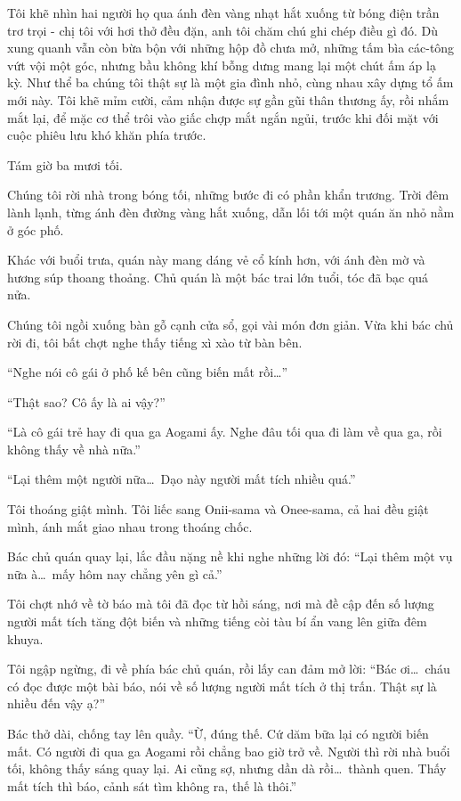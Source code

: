 \documentclass[../main.tex]{subfiles}
\begin{document}
Tôi khẽ nhìn hai người họ qua ánh đèn vàng nhạt hắt xuống từ bóng điện trần trơ trọi - chị tôi với hơi thở đều đặn, anh tôi chăm chú ghi chép điều gì đó. Dù xung quanh vẫn còn bừa bộn với những hộp đồ chưa mở, những tấm bìa các-tông vứt vội một góc, nhưng bầu không khí bỗng dưng mang lại một chút ấm áp lạ kỳ. Như thể ba chúng tôi thật sự là một gia đình nhỏ, cùng nhau xây dựng tổ ấm mới này. Tôi khẽ mỉm cười, cảm nhận được sự gần gũi thân thương ấy, rồi nhắm mắt lại, để mặc cơ thể trôi vào giấc chợp mắt ngắn ngủi, trước khi đối mặt với cuộc phiêu lưu khó khăn phía trước.

\ct

Tám giờ ba mươi tối.

Chúng tôi rời nhà trong bóng tối, những bước đi có phần khẩn trương. Trời đêm lành lạnh, từng ánh đèn đường vàng hắt xuống, dẫn lối tới một quán ăn nhỏ nằm ở góc phố.

Khác với buổi trưa, quán này mang dáng vẻ cổ kính hơn, với ánh đèn mờ và hương súp thoang thoảng. Chủ quán là một bác trai lớn tuổi, tóc đã bạc quá nửa.

Chúng tôi ngồi xuống bàn gỗ cạnh cửa sổ, gọi vài món đơn giản. Vừa khi bác chủ rời đi, tôi bất chợt nghe thấy tiếng xì xào từ bàn bên.

``Nghe nói cô gái ở phố kế bên cũng biến mất rồi\dots''

``Thật sao? Cô ấy là ai vậy?''

``Là cô gái trẻ hay đi qua ga Aogami ấy. Nghe đâu tối qua đi làm về qua ga, rồi không thấy về nhà nữa.''

``Lại thêm một người nữa\dots\ Dạo này người mất tích nhiều quá.''

Tôi thoáng giật mình. Tôi liếc sang Onii-sama và Onee-sama, cả hai đều giật mình, ánh mắt giao nhau trong thoáng chốc.

Bác chủ quán quay lại, lắc đầu nặng nề khi nghe những lời đó: ``Lại thêm một vụ nữa à\dots\ mấy hôm nay chẳng yên gì cả.''

Tôi chợt nhớ về tờ báo mà tôi đã đọc từ hồi sáng, nơi mà đề cập đến số lượng người mất tích tăng đột biến và những tiếng còi tàu bí ẩn vang lên giữa đêm khuya.

Tôi ngập ngừng, đi về phía bác chủ quán, rồi lấy can đảm mở lời: ``Bác ơi\dots\ cháu có đọc được một bài báo, nói về số lượng người mất tích ở thị trấn. Thật sự là nhiều đến vậy ạ?''

Bác thở dài, chống tay lên quầy.
``Ừ, đúng thế. Cứ dăm bữa lại có người biến mất. Có người đi qua ga Aogami rồi chẳng bao giờ trở về. Người thì rời nhà buổi tối, không thấy sáng quay lại. Ai cũng sợ, nhưng dần dà rồi\dots\ thành quen. Thấy mất tích thì báo, cảnh sát tìm không ra, thế là thôi.''
\end{document}
